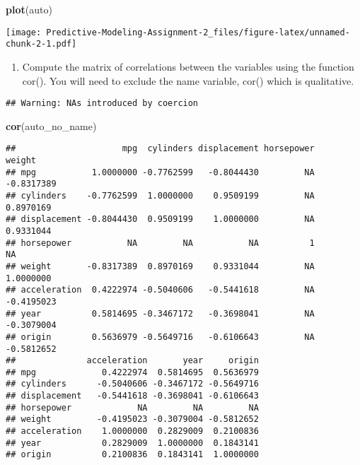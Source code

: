 \documentclass[
]{article}
\newenvironment{Shaded}{\begin{snugshade}}{\end{snugshade}}
\newcommand{\FunctionTok}[1]{\textcolor[rgb]{0.13,0.29,0.53}{\textbf{#1}}}
\newcommand{\NormalTok}[1]{#1}
\newcommand{\OtherTok}[1]{\textcolor[rgb]{0.56,0.35,0.01}{#1}}
\newcommand{\SpecialCharTok}[1]{\textcolor[rgb]{0.81,0.36,0.00}{\textbf{#1}}}
\providecommand{\tightlist}{%
  \setlength{\itemsep}{0pt}\setlength{\parskip}{0pt}}
\begin{document}
\begin{Shaded}
\begin{Highlighting}[]
\FunctionTok{plot}\NormalTok{(auto)}
\end{Highlighting}
\end{Shaded}

\texttt{[image: Predictive-Modeling-Assignment-2\_files/figure-latex/unnamed-chunk-2-1.pdf]}

\begin{enumerate}
\def\labelenumi{(\alph{enumi})}
\setcounter{enumi}{1}
\tightlist
\item
  Compute the matrix of correlations between the variables using the
  function cor(). You will need to exclude the name variable, cor()
  which is qualitative.
\end{enumerate}

\begin{Shaded}
\end{Shaded}

\begin{verbatim}
## Warning: NAs introduced by coercion
\end{verbatim}

\begin{Shaded}
\begin{Highlighting}[]
\FunctionTok{cor}\NormalTok{(auto\_no\_name)}
\end{Highlighting}
\end{Shaded}

\begin{verbatim}
##                     mpg  cylinders displacement horsepower     weight
## mpg           1.0000000 -0.7762599   -0.8044430         NA -0.8317389
## cylinders    -0.7762599  1.0000000    0.9509199         NA  0.8970169
## displacement -0.8044430  0.9509199    1.0000000         NA  0.9331044
## horsepower           NA         NA           NA          1         NA
## weight       -0.8317389  0.8970169    0.9331044         NA  1.0000000
## acceleration  0.4222974 -0.5040606   -0.5441618         NA -0.4195023
## year          0.5814695 -0.3467172   -0.3698041         NA -0.3079004
## origin        0.5636979 -0.5649716   -0.6106643         NA -0.5812652
##              acceleration       year     origin
## mpg             0.4222974  0.5814695  0.5636979
## cylinders      -0.5040606 -0.3467172 -0.5649716
## displacement   -0.5441618 -0.3698041 -0.6106643
## horsepower             NA         NA         NA
## weight         -0.4195023 -0.3079004 -0.5812652
## acceleration    1.0000000  0.2829009  0.2100836
## year            0.2829009  1.0000000  0.1843141
## origin          0.2100836  0.1843141  1.0000000
\end{verbatim}
\end{document}
